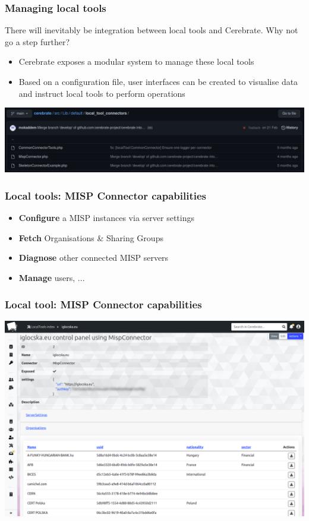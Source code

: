 \begin{frame}
\frametitle{Managing local tools}
There will inevitably be integration between local tools and Cerebrate. Why not go a step further?
    \begin{itemize}
        \item Cerebrate exposes a modular system to manage these local tools
        \item Based on a configuration file, user interfaces can be created to visualise data and instruct local tools to perform operations
    \end{itemize}
    \begin{center}
        \includegraphics[width=0.9\linewidth]{pictures/github-local-tool.png}
    \end{center}
\end{frame}

\begin{frame}
\frametitle{Local tools: MISP Connector capabilities}
    \begin{itemize}
        \item \textbf{Configure} a MISP instances via server settings
        \item \textbf{Fetch} Organisations \& Sharing Groups
        \item \textbf{Diagnose} other connected MISP servers
        \item \textbf{Manage} users, ...
    \end{itemize}
\end{frame}

\begin{frame}
\frametitle{Local tool: MISP Connector capabilities}
    \begin{center}
        \includegraphics[width=0.97\linewidth]{pictures/localtool-view.png}
    \end{center}
\end{frame}

